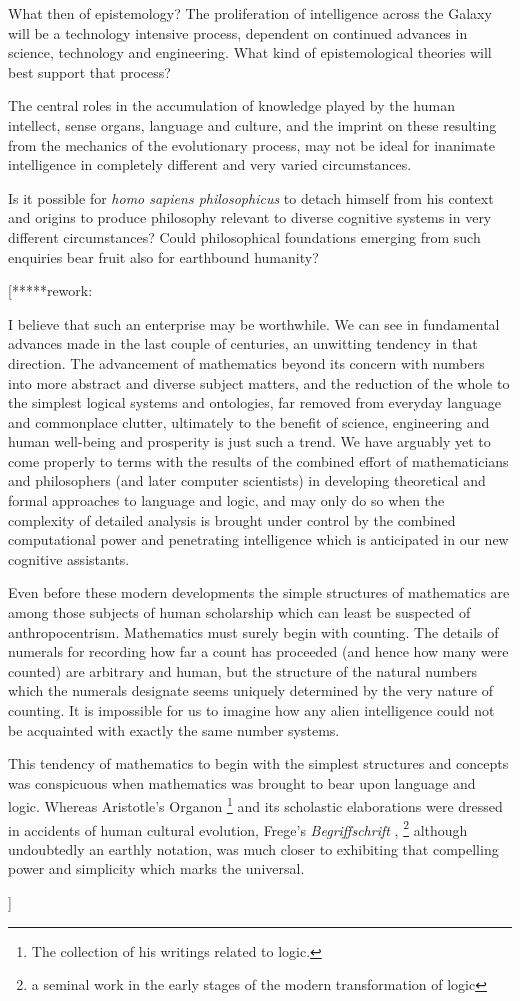 \documentclass[10pt,titlepage]{book}
\begin{document}
What then of epistemology?
The proliferation of intelligence across the Galaxy will be a technology intensive process, dependent on continued advances in science, technology and engineering.
What kind of epistemological theories will best support that process?

The central roles in the accumulation of knowledge played by the human intellect, sense organs, language and culture, and the imprint on these resulting from the mechanics of the evolutionary process, may not be ideal for inanimate intelligence in completely different and very varied circumstances.

Is it possible for \emph{homo sapiens philosophicus} to detach himself from his context and origins to produce philosophy relevant to diverse cognitive systems in very different circumstances?
Could philosophical foundations emerging from such enquiries bear fruit also for earthbound humanity?

[*****rework:{\it

I believe that such an enterprise may be worthwhile.
We can see in fundamental advances made in the last couple of centuries, an unwitting tendency in that direction.
The advancement of mathematics beyond its concern with numbers into more abstract and diverse subject matters, and the reduction of the whole to the simplest logical systems and ontologies, far removed from everyday language and commonplace clutter, ultimately to the benefit of science, engineering and human well-being and prosperity is just such a trend.
We have arguably yet to come properly to terms with the results of the combined effort of mathematicians and philosophers (and later computer scientists) in developing theoretical and formal approaches to language and logic, and may only do so when the complexity of detailed analysis is brought under control by the combined computational power and penetrating intelligence which is anticipated in our new cognitive assistants.

Even before these modern developments the simple structures of mathematics are among those subjects of human scholarship which can least be suspected of anthropocentrism.
Mathematics must surely begin with counting.
The details of numerals for recording how far a count has proceeded (and hence how many were counted) are arbitrary and human, but the structure of the natural numbers which the numerals designate seems uniquely determined by the very nature of counting.
It is impossible for us to imagine how any alien intelligence could not be acquainted with exactly the same number systems.

This tendency of mathematics to begin with the simplest structures and concepts was conspicuous when mathematics was brought to bear upon language and logic.
Whereas Aristotle's Organon%
\footnote{The collection of his writings related to logic.}%
and its scholastic elaborations were dressed in accidents of human cultural evolution, Frege's \emph{Begriffschrift} \cite{frege79}, %
\footnote{a seminal work in the early stages of the modern transformation of logic}%
  although undoubtedly an earthly notation, was much closer to exhibiting that compelling power and simplicity which marks the universal.

}]
\end{document}
